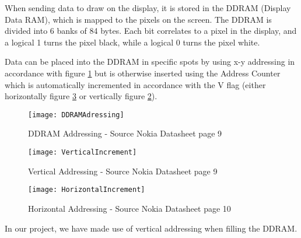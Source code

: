 When sending data to draw on the display, it is stored in the DDRAM (Display Data RAM), which is mapped to the pixels on the screen. The DDRAM is divided into 6 banks of 84 bytes. Each bit correlates to a pixel in the display, and a logical 1 turns the pixel black, while a logical 0 turns the pixel white.

Data can be placed into the DDRAM in specific spots by using x-y addressing in accordance with figure \ref{DDRAMAdressing} but is otherwise inserted using the Address Counter which is automatically incremented in accordance with the V flag (either horizontally figure \ref{HorizontalIncrement} or vertically figure \ref{VerticalIncrement}).

\begin{figure}[H]
	\texttt{[image: DDRAMAdressing]}
	\centering
	\caption{DDRAM Addressing - Source Nokia Datasheet\cite{NokiaDisplay} page 9}
	\label{DDRAMAdressing}
\end{figure}

\begin{figure}[H]
	\texttt{[image: VerticalIncrement]}
	\centering
	\caption{Vertical Addressing - Source Nokia Datasheet\cite{NokiaDisplay} page 9}
	\label{VerticalIncrement}
\end{figure}

\begin{figure}[H]
	\texttt{[image: HorizontalIncrement]}
	\centering
	\caption{Horizontal Addressing - Source Nokia Datasheet\cite{NokiaDisplay} page 10}
	\label{HorizontalIncrement}
\end{figure}

In our project, we have made use of vertical addressing when filling the DDRAM.